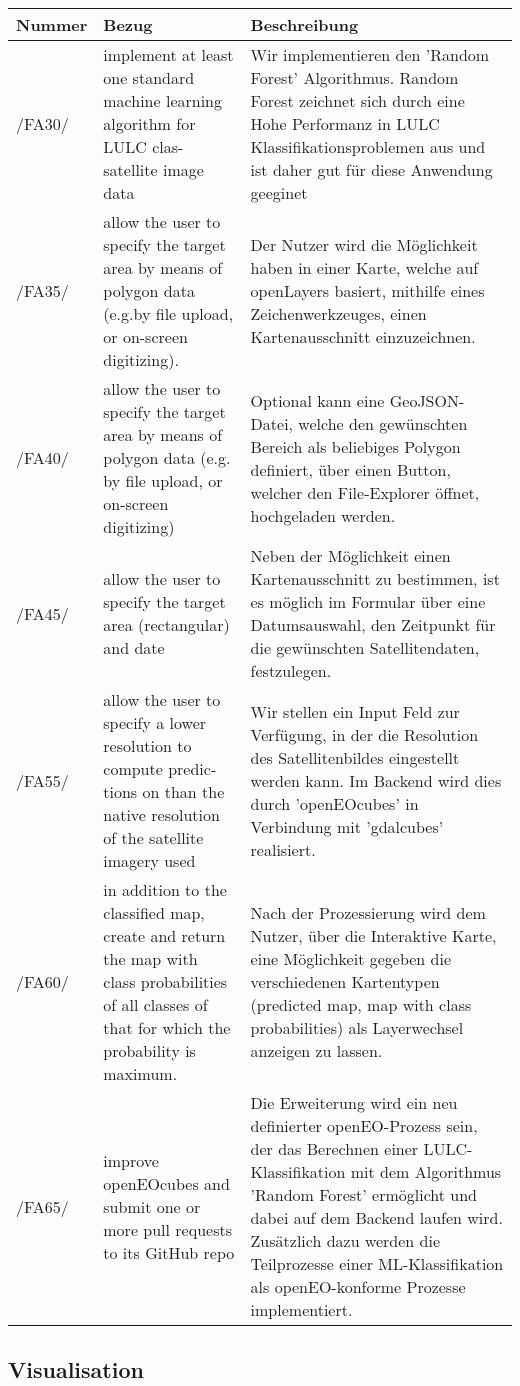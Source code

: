 \documentclass[a4paper,12pt]{article}
\newcommand{\addrow}[3]{#1 &#2 &#3 \\ [0.2cm]}
\newcommand{\addheading}[3]{#1 &#2 &#3\\ \hline }
\newcommand{\tabularhead}{\begin{tabular}{l p{5cm} p{8cm}}
\hline
}
\newenvironment{usecase}{\tabularhead}
{\hline\end{tabular}}
\begin{document}
\begin{usecase}
  \addheading{Nummer}{Bezug}{Beschreibung} 
  \addrow{/FA30/}{implement at least one standard machine learning algorithm for LULC clas-
  satellite image data}{Wir implementieren den 'Random Forest' Algorithmus. Random Forest zeichnet sich durch eine Hohe Performanz in LULC Klassifikationsproblemen aus und ist daher gut für diese Anwendung geeginet}
  \addrow{/FA35/}{allow the user to specify the target area by means of polygon data (e.g.by file upload, or on-screen digitizing).}{Der Nutzer wird die Möglichkeit haben in einer Karte, welche auf openLayers basiert, mithilfe eines Zeichenwerkzeuges, einen Kartenausschnitt einzuzeichnen.}
  \addrow{/FA40/}{allow the user to specify the target area by means of polygon
data (e.g. by file upload, or on-screen digitizing)
}{Optional kann eine GeoJSON-Datei, welche den gewünschten Bereich als beliebiges Polygon definiert, über einen Button, welcher den File-Explorer öffnet, hochgeladen werden.}
  \addrow{/FA45/}{allow the user to specify the target area (rectangular) and date
}{Neben der Möglichkeit einen Kartenausschnitt zu bestimmen, ist es möglich im Formular über eine Datumsauswahl, den Zeitpunkt für die gewünschten Satellitendaten, festzulegen.}
  \addrow{/FA55/}{allow the user to specify a lower resolution to compute predic-
tions on than the native resolution of the satellite imagery used}{Wir stellen ein Input Feld zur Verfügung, in der die Resolution des Satellitenbildes eingestellt werden kann. Im Backend wird dies durch 'openEOcubes' in Verbindung mit 'gdalcubes' realisiert.}
  \addrow{/FA60/}{in addition to the classified map, create and return the map with class probabilities of all classes of that for which the probability is maximum.}{Nach der Prozessierung wird dem Nutzer, über die Interaktive Karte, eine Möglichkeit gegeben die verschiedenen Kartentypen (predicted map, map with class probabilities) als Layerwechsel anzeigen zu lassen.}
  \addrow{/FA65/}{improve openEOcubes and submit one or more pull requests to its GitHub repo}{Die Erweiterung wird ein neu definierter openEO-Prozess sein, der das Berechnen einer LULC-Klassifikation mit dem Algorithmus 'Random Forest' ermöglicht und dabei auf dem Backend laufen wird. Zusätzlich dazu werden die Teilprozesse einer ML-Klassifikation als openEO-konforme Prozesse implementiert.}

\end{usecase}

\subsection{Visualisation}
\end{document}
